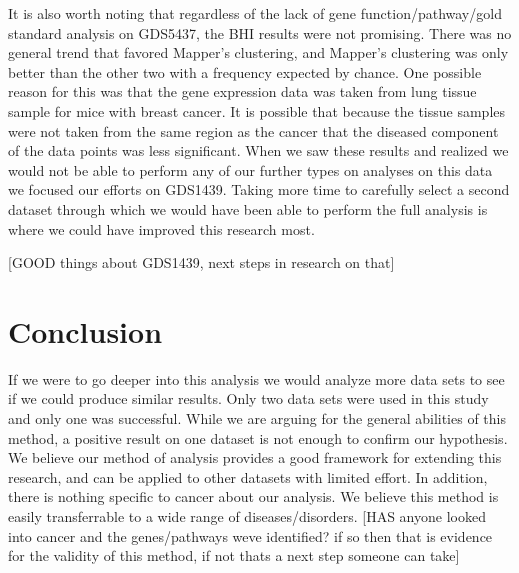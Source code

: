 \documentclass[preprint,10pt]{elsarticle}
\begin{document}
	It is also worth noting that regardless of the lack of gene function/pathway/gold standard analysis on GDS5437, the BHI results were not promising. There was no general trend that favored Mapper's clustering, and Mapper's clustering was only better than the other two with a frequency expected by chance. One possible reason for this was that the gene expression data was taken from lung tissue sample for mice with breast cancer. It is possible that because the tissue samples were not taken from the same region as the cancer that the diseased component of the data points was less significant. When we saw these results and realized we would not be able to perform any of our further types on analyses on this data we focused our efforts on GDS1439. Taking more time to carefully select a second dataset through which we would have been able to perform the full analysis is where we could have improved this research most.
	
	[GOOD things about GDS1439, next steps in research on that]


\section{Conclusion}


If we were to go deeper into this analysis we would analyze more data sets to see if we could produce similar results. Only two data sets were used in this study and only one was successful. While we are arguing for the general abilities of this method, a positive result on one dataset is not enough to confirm our hypothesis. We believe our method of analysis provides a good framework for extending this research, and can be applied to other datasets with limited effort. In addition, there is nothing specific to cancer about our analysis. We believe this method is easily transferrable to a wide range of diseases/disorders. 
[HAS anyone looked into cancer and the genes/pathways weve identified? if so then that is evidence for the validity of this method, if not thats a next step someone can take]




\end{document}
